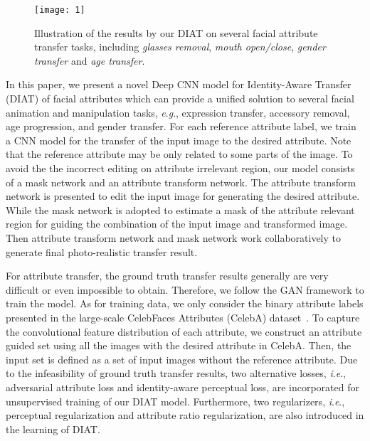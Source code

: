\documentclass[journal]{IEEEtran}
\newcommand{\ie}{\textit{i}.\textit{e}.}
\newcommand{\eg}{\textit{e}.\textit{g}.}
\begin{document}
\begin{figure*}[t]
\begin{center}
\texttt{[image: 1]}
\end{center}
   \caption{Illustration of the results by our DIAT on several facial attribute transfer tasks, including \emph{glasses removal}, \emph{mouth open/close}, \emph{gender transfer} and \emph{age transfer}. }
\label{outline}
\end{figure*}


In this paper, we present a novel Deep CNN model for Identity-Aware Transfer (DIAT) of facial attributes which can provide a unified solution to several facial animation and manipulation tasks, \eg, expression transfer, accessory removal, age progression, and gender transfer.
For each reference attribute label, we train a CNN model for the transfer of the input image to the desired attribute.
Note that the reference attribute may be only related to some parts of the image.
To avoid the the incorrect editing on attribute irrelevant region, our model consists of a mask network and an attribute transform network.
The attribute transform network is presented to edit the input image for generating the desired attribute.
While the mask network is adopted to estimate a mask of the attribute relevant region for guiding the combination of the input image and transformed image.
Then attribute transform network and mask network work collaboratively to generate final photo-realistic transfer result.


For attribute transfer, the ground truth transfer results generally are very difficult or even impossible to obtain. Therefore, we follow the GAN framework to train the model.
As for training data, we only consider the binary attribute labels presented in the large-scale CelebFaces Attributes (CelebA) dataset~\cite{liu2015faceattributes}.
To capture the convolutional feature distribution of each attribute, we construct an attribute guided set using all the images with the desired attribute in CelebA.
Then, the input set is defined as a set of input images without the reference attribute.
Due to the infeasibility of ground truth transfer results, two alternative losses, \ie, adversarial attribute loss and identity-aware perceptual loss, are incorporated for unsupervised training of our DIAT model.
Furthermore, two regularizers, \ie, perceptual regularization and attribute ratio regularization, are also introduced in the learning of DIAT.
\end{document}
